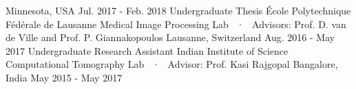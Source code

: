 \begin{cventries}
    {Minnesota, USA} %
    {Jul. 2017 - Feb. 2018} %
    {}
   \cventryLab
    {Undergraduate Thesis} %
    {École Polytechnique Fédérale de Lausanne} %
    {Medical Image Processing Lab ~·~ Advisors: Prof. D. van de Ville and Prof. P. Giannakopoulos} %
    {Lausanne, Switzerland} %
    {Aug. 2016 - May 2017} %
    {}
   \cventryLab
    {Undergraduate Research Assistant} %
    {Indian Institute of Science} %
    {Computational Tomography Lab ~·~ Advisor: Prof. Kasi Rajgopal} %
    {Bangalore, India} %
    {May 2015 - May 2017} %
    {}
\vspace{3mm}
\end{cventries}

